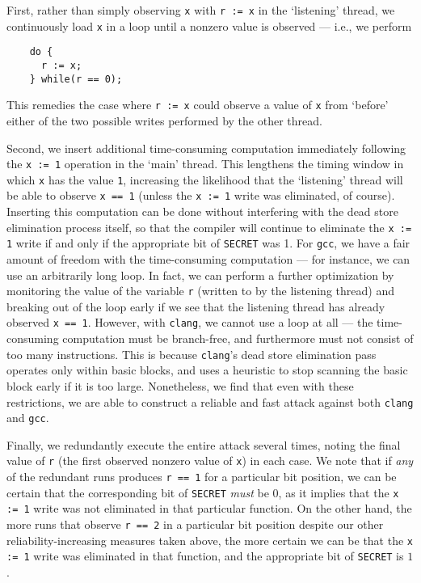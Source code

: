 First, rather than simply observing \verb|x| with \verb|r := x| in the
`listening' thread, we continuously load \verb|x| in a loop until a
nonzero value is observed --- i.e., we perform
\begin{verbatim}
    do {
      r := x;
    } while(r == 0);
\end{verbatim}
This remedies the case where \verb|r := x| could observe a value of \verb|x|
from `before' either of the two possible writes performed by the other thread.

Second, we insert additional time-consuming computation immediately following
the \verb|x := 1| operation in the `main' thread.
This lengthens the timing window in which \verb|x| has the value \verb|1|,
increasing the likelihood that the `listening' thread will be able to observe
\verb|x == 1| (unless the \verb|x := 1| write was eliminated, of course).
Inserting this computation can be done without interfering with the dead store
elimination process itself, so that the compiler will continue to eliminate
the \verb|x := 1| write if and only if the appropriate bit of \verb|SECRET|
was 1.
For \verb|gcc|, we have a fair amount of freedom with the time-consuming
computation --- for instance, we can use an arbitrarily long loop.
In fact, we can perform a further optimization by monitoring the value of the
variable \verb|r| (written to by the listening thread) and breaking out of the
loop early if we see that the listening thread has already observed
\verb|x == 1|.
However, with \verb|clang|, we cannot use a loop at all --- the time-consuming
computation must be branch-free, and furthermore must not consist of too many
instructions.
This is because \verb|clang|'s dead store elimination pass operates only
within basic blocks, and uses a heuristic to stop scanning the basic block
early if it is too large.
Nonetheless, we find that even with these restrictions, we are able to
construct a reliable and fast attack against both \verb|clang| and \verb|gcc|.

Finally, we redundantly execute the entire attack several times, noting the
final value of \verb|r| (the first observed nonzero value of \verb|x|) in each
case.
We note that if \emph{any} of the redundant runs produces \verb|r == 1| for a
particular bit position, we can be certain that the corresponding bit of
\verb|SECRET| \emph{must} be $0$, as it implies that the \verb|x := 1| write
was not eliminated in that particular function.
On the other hand, the more runs that observe \verb|r == 2| in a particular bit
position despite our other reliability-increasing measures taken above, the
more certain we can be that the \verb|x := 1| write was eliminated in that
function, and the appropriate bit of \verb|SECRET| is $1$.

